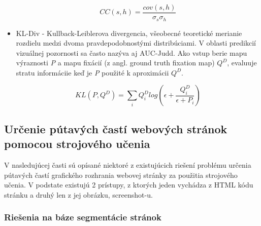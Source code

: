 \begin{itemize}
	\begin{equation}
	CC (s, h) = \frac{cov(s, h)}{\sigma_{s} \sigma _{h}}
	\end{equation}
	
	\item KL-Div - Kullback-Leiblerova divergencia, všeobecné teoretické merianie rozdielu medzi dvoma pravdepodobnostými distribúciami. V oblasti predikcií vizuálnej pozornosti sa často nazýva aj AUC-Judd. Ako vstup berie mapu výraznosti \textit{P} a mapu fixácií (z angl.  ground  truth  fixation map) \textit{$Q^{D}$}, evaluuje stratu informáciie keď je \textit{P} použité k aproximácii \textit{$Q^{D}$}.
	
	\begin{equation}
		KL (P, Q^D) =  \sum_{i} Q_{i}^{D} log \left ( \epsilon + \frac{Q_{i}^{D}}{\epsilon + P_i} \right )
	\end{equation}
	
\end{itemize}
 
 
\iffalse	
\subsection{Určenie pútavých častí webových stránok pomocou strojového učenia}
\label{machine_learning}
	V nasledujúcej časti sú opísané niektoré z existujúcich riešení problému určenia pútavých častí grafického rozhrania webovej stránky za použitia strojového učenia. V podstate existujú 2 prístupy, z ktorých jeden vychádza z HTML kódu stránku a druhý len z jej obrázku, screenshot-u. 
	

\subsubsection{Riešenia na báze segmentácie stránok}

